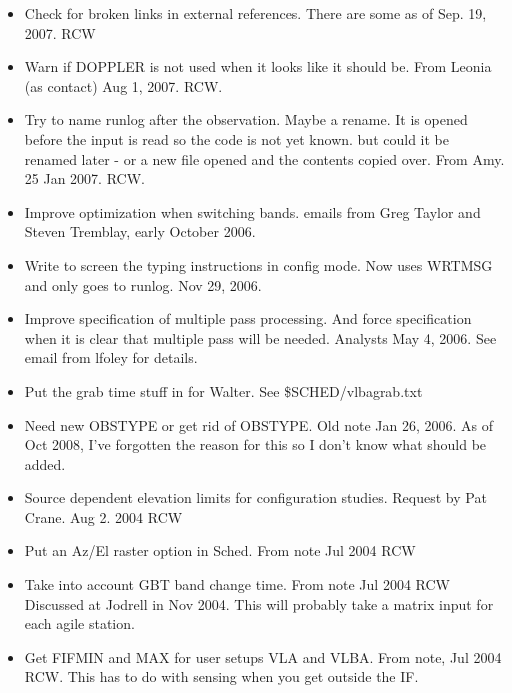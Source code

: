 \documentclass{report}
\begin{document}
\begin{itemize}
\item Check for broken links in external references.  There are some
      as of Sep. 19, 2007.  RCW

\item Warn if DOPPLER is not used when it looks like it should be.
      From Leonia (as contact) Aug 1, 2007.  RCW.

\item Try to name runlog after the observation.  Maybe a rename.  It
      is opened before the input is read so the code is not yet known.
      but could it be renamed later - or a new file opened and the
      contents copied over.  From Amy.  25 Jan 2007.  RCW.

\item Improve optimization when switching bands.  emails from Greg Taylor and
      Steven Tremblay, early October 2006.

\item Write to screen the typing instructions in config mode.  Now uses
      WRTMSG and only goes to runlog.  Nov 29, 2006.

\item Improve specification of multiple pass processing.  And force
      specification when it is clear that multiple pass will be needed.
      Analysts  May 4, 2006.  See email from lfoley for details.

\item Put the grab time stuff in for Walter.  See \$SCHED/vlbagrab.txt

\item Need new OBSTYPE or get rid of OBSTYPE.  Old note  Jan 26, 2006.
      As of Oct 2008, I've forgotten the reason for this so I don't
      know what should be added.

\item Source dependent elevation limits for configuration studies.
      Request by Pat Crane.  Aug 2. 2004 RCW

\item Put an Az/El raster option in Sched.  From note Jul 2004 RCW

\item Take into account GBT band change time.  From note Jul 2004 RCW
      Discussed at Jodrell in Nov 2004.  This will probably take a
      matrix input for each agile station.

\item Get FIFMIN and MAX for user setups VLA and VLBA.  From note, Jul
      2004 RCW.  This has to do with sensing when you get outside the
      IF.


\end{itemize}
\end{document}
